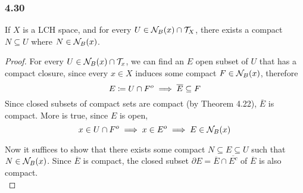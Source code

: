 \documentclass[../../main.tex]{subfiles}
\begin{document}
\subsubsection*{4.30}
\begin{wts}
    If $X$ is a LCH space, and for every $U\in\mathcal{N}_B({x})\cap\mathcal{T}_X$, there exists a compact $N\subseteq U$ where $N\in\mathcal{N}_B({x})$.
\end{wts}
\renewcommand{\oe}{\overline{E}}
\begin{proof}
    For every $U\in \mathcal{N}_B({x})\cap\mathcal{T}_x$, we can find an $E$ open subset of $U$ that has a compact closure, since every $x\in X$ induces some compact $F\in\mathcal{N}_B({x})$, therefore
    \[
    E\coloneqq U\cap F^o\implies \overline{E}\subseteq F
    \]
    Since closed subsets of compact sets are compact (by Theorem 4.22), $\overline{E}$ is compact. More is true, since $E$ is open,
    \[
    x\in U\cap F^o\implies x\in E^o\implies E\in\mathcal{N}_B({x})
    \]
    
    
    
    Now it suffices to show that there exists some compact $N\subseteq E\subseteq U$ such that $N\in\mathcal{N}_B({x})$. Since $\oe$ is compact, the closed subset $\partial E = \oe\cap\overline{E^c}$ of $\oe$ is also compact.\\
    

\end{proof}
\end{document}
